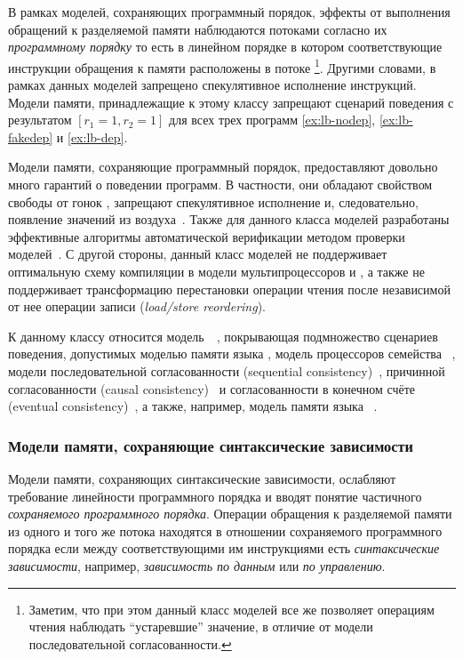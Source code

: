 В рамках моделей, сохраняющих программный порядок, 
эффекты от выполнения обращений к разделяемой памяти
наблюдаются потоками согласно их \emph{программному порядку}
то есть в линейном порядке в котором соответствующие 
инструкции обращения к памяти расположены в потоке%
\footnote{Заметим, что при этом данный класс моделей 
все же позволяет операциям чтения наблюдать ``устаревшие'' значение, 
в отличие от модели последовательной согласованности.}. 
Другими словами, в рамках данных моделей запрещено 
спекулятивное исполнение инструкций. 
Модели памяти, принадлежащие к этому классу 
запрещают сценарий поведения с результатом ${[r_1=1,r_2=1]}$
для всех трех программ \ref{ex:lb-nodep}, \ref{ex:lb-fakedep} и \ref{ex:lb-dep}.

Модели памяти, сохраняющие программный порядок, 
предоставляют довольно много гарантий о поведении программ. 
В частности, они обладают свойством свободы от гонок \DRF, 
запрещают спекулятивное исполнение и, следовательно, 
появление значений из воздуха~\cite{Lahav-al:PLDI17}. 
Также для данного класса моделей разработаны эффективные 
алгоритмы автоматической верификации 
методом проверки моделей~\cite{Kokologiannakis-al:POPL2017, Kokologiannakis:PLDI2019}.
С другой стороны, данный класс моделей не поддерживает
оптимальную схему компиляции в модели мультипроцессоров
\ARM и \POWER, а также не поддерживает трансформацию 
перестановки операции чтения после независимой
от нее операции записи (\emph{load/store reordering}). 

К данному классу относится модель~\RCMM~\cite{Lahav-al:PLDI17}, 
покрывающая подмножество сценариев поведения, допустимых моделью памяти языка \CLANG,
модель \TSO процессоров семейства \Intel~\cite{Sewell-al:CACM10},
модели последовательной согласованности (sequential consistency)~\cite{Lamport:TC79},
причинной согласованности (causal consistency)~\autocite{Lahav-Boker:PLDI2020}
и согласованности в конечном счёте (eventual consistency)~\cite{Jagadeesan-al:ESOP2018},
а также, например, модель памяти языка \OCaml~\cite{Dolan-al:PLDI18}.

\subsubsection*{Модели памяти, сохраняющие синтаксические зависимости}

Модели памяти, сохраняющих синтаксические зависимости, 
ослабляют требование линейности программного порядка 
и вводят понятие частичного \emph{сохраняемого программного порядка}. 
Операции обращения к разделяемой памяти из одного и того же потока
находятся в отношении сохраняемого программного порядка 
если между соответствующими им инструкциями есть 
\emph{синтаксические зависимости}, например, 
\emph{зависимость по данным} или \emph{по управлению}. 

